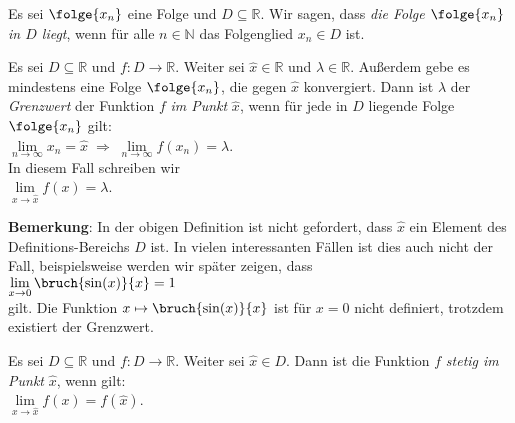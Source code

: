 \begin{Definition}
Es sei $\folge{x_n}$ eine Folge und $D\subseteq \mathbb{R}$.  Wir sagen, dass 
\emph{die Folge $\folge{x_n}$ in $D$ liegt}, wenn f\"ur alle $n \in \mathbb{N}$ das Folgenglied $x_n
\in D$ ist.   
\end{Definition}

\begin{Definition}
  Es sei $D\subseteq \mathbb{R}$ und $f:D \rightarrow \mathbb{R}$.
  Weiter sei $\widehat{x} \in \mathbb{R}$ und  $\lambda\in \mathbb{R}$.  Au{\ss}erdem gebe es
  mindestens eine Folge $\folge{x_n}$, die gegen $\widehat{x}$ konvergiert.
  Dann ist $\lambda$ der \emph{Grenzwert} der Funktion $f$ \emph{im Punkt} $\widehat{x}$,
  wenn f\"ur jede in $D$ liegende Folge $\folge{x_n}$ gilt:
      \\[0.2cm]
      \hspace*{1.3cm}      
      $\lim\limits_{n\rightarrow\infty} x_n = \widehat{x} \;\Rightarrow\; \lim\limits_{n\rightarrow\infty} f(x_n) = \lambda$.
      \\[0.2cm]
      In diesem Fall schreiben wir 
      \\[0.2cm]
      \hspace*{1.3cm}      
      $\lim\limits_{x \rightarrow \widehat{x}} f(x) = \lambda$. 
      \eod
\end{Definition}

\noindent
\textbf{Bemerkung}:  In der obigen Definition ist nicht gefordert,
dass $\widehat{x}$ ein Element des Definitions-Bereichs  $D$ ist.  In vielen interessanten F\"allen
ist dies auch nicht der Fall, beispielsweise werden wir sp\"ater zeigen, dass 
\\[0.2cm]
\hspace*{1.3cm}      
$\lim\limits_{x \rightarrow 0} \bruch{\sin(x)}{x} = 1$
\\[0.2cm]
gilt. Die Funktion $x \mapsto \bruch{\sin(x)}{x}$ ist f\"ur $x=0$ nicht definiert, trotzdem
existiert der Grenzwert.
\eox


\begin{Definition}[Stetigkeit]
  Es sei $D\subseteq \mathbb{R}$ und $f:D \rightarrow \mathbb{R}$.
  Weiter sei $\widehat{x}\in D$. Dann ist die Funktion $f$ \emph{stetig im Punkt} $\widehat{x}$,
  wenn gilt: \\[0.2cm]
  \hspace*{1.3cm}      
  $\lim\limits_{x\rightarrow \widehat{x}} f(x) = f(\widehat{x})$.  \eod
\end{Definition}

